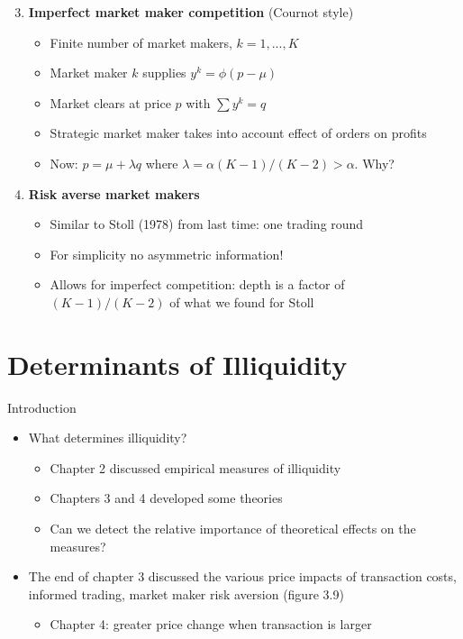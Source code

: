 \documentclass[english,10pt]{beamer}
\begin{document}
\begin{frame}{}
	\begin{enumerate}
		\setcounter{enumi}{2}
		\item \textbf{Imperfect market maker competition} (Cournot style)
		\begin{itemize}
			\item Finite number of market makers, $k=1,..., K$
			\item Market maker $k$ supplies $y^k=\phi(p-\mu)$
			\item Market clears at price $p$ with $\sum y^k = q$
			\item Strategic market maker takes into account effect of orders on profits
			\item Now: $p=\mu+\lambda q$ where $\lambda = \alpha (K-1)/(K-2) > \alpha$. Why? 
			\pause {}
		\end{itemize}
		\pause
		\item \textbf{Risk averse market makers}
		\begin{itemize}
			\item Similar to Stoll (1978) from last time: one trading round
			\item For simplicity no asymmetric information!
			\item Allows for imperfect competition: depth is a factor of $(K-1)/(K-2)$ of what we found for Stoll
		\end{itemize}
	\end{enumerate}
\end{frame}



\section{Determinants of Illiquidity}

\begin{frame}{Introduction}
	\begin{itemize}
		\item What determines illiquidity?
		\begin{itemize}
			\item Chapter 2 discussed empirical measures of illiquidity
			\item Chapters 3 and 4 developed some theories
			\item Can we detect the relative importance of theoretical effects on the measures?
		\end{itemize}
		\item The end of chapter 3 discussed the various price impacts of transaction costs, informed trading, market maker risk aversion (figure 3.9)
		\begin{itemize}
			\item Chapter 4: greater price change when transaction is larger
		\end{itemize}
	\end{itemize}
\end{frame}
\end{document}
